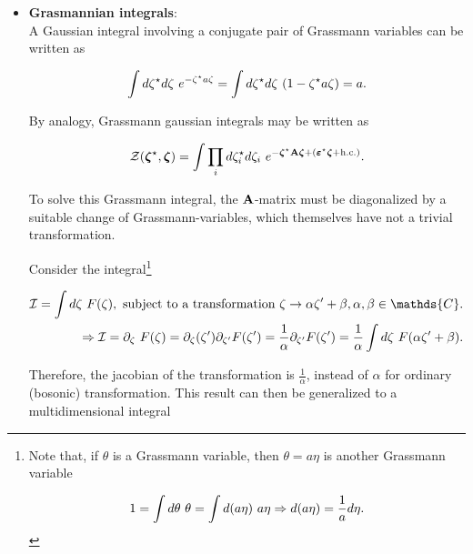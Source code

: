 \documentclass{homework}
\begin{document}
\begin{itemize}
\item \textbf{Grasmannian integrals}:\\

A Gaussian integral involving a conjugate pair of Grassmann variables can be written as

$$
\int d\zeta^\star d\zeta \textnormal{ } e^{-\zeta^\star a \zeta} = \int d\zeta^\star d\zeta \textnormal{ } (1- \zeta^\star a \zeta) = a.
$$

By analogy, Grassmann gaussian integrals may be written as 

\begin{equation}
    \mathcal{Z}(\bm{\zeta}^\star,\bm{\zeta}) = \int \prod_{i} d{\zeta}_i^\star d{\zeta}_i \textnormal{ } e^{- \bm{\zeta}^\star {\bf A} \bm{\zeta} + (\bm{\varepsilon}^\star \bm{\zeta} + \textnormal{h.c.})}.
    \label{Grassmannian gaussian integral}
\end{equation}

To solve this Grassmann integral, the ${\bf A}$-matrix must be diagonalized by a suitable change of Grassmann-variables, which themselves have not a trivial transformation. 

\begin{tcolorbox}[colback=yellow!10!white,colframe=red!75!black,lowerbox=invisible, title = Transformation of Grassmann variables ]

Consider the integral\footnote{Note that, if $\theta$ is a Grassmann variable, then $\theta = a\eta$ is another Grassmann variable 

$$
1 = \int d\theta \textnormal{ } \theta = \int d(a \eta) \textnormal{ } a\eta \Rightarrow d(a \eta) = \frac{1}{a} d\eta.
$$}

\begin{equation}
    \begin{split}
        \mathcal{I} = \int d\zeta \blanky F(\zeta), \textnormal{ subject to a transformation } \zeta \rightarrow \alpha \zeta' + \beta, \alpha, \beta \in \mathds{C}. \\
        \Rightarrow \mathcal{I} = \partial_{\zeta} \blanky F(\zeta) = \partial_{\zeta} (\zeta') \partial_{\zeta'} F(\zeta') = \frac{1}{\alpha} \partial_{\zeta'} F(\zeta')  = \frac{1}{\alpha} \int d\zeta \blanky F(\alpha \zeta' + \beta).
    \end{split}
\end{equation}

Therefore, the jacobian of the transformation is $\frac{1}{\alpha}$, instead of $\alpha$ for ordinary (bosonic) transformation. This result can then be generalized to a multidimensional integral 


\end{tcolorbox}
\end{itemize}
\end{document}
